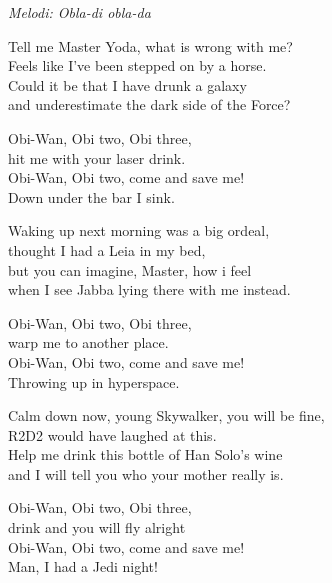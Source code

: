 {\footnotesize\textit{Melodi: Obla-di obla-da}}\par
\vspace{10pt}
Tell me Master Yoda, what is wrong with me?\\
Feels like I've been stepped on by a horse.\\
Could it be that I have drunk a galaxy\\
and underestimate the dark side of the Force?\par
\vspace{10pt}
Obi-Wan, Obi two, Obi three,\\
hit me with your laser drink.\\
Obi-Wan, Obi two, come and save me! \\
Down under the bar I sink.\par
\vspace{10pt}
Waking up next morning was a big ordeal,\\
thought I had a Leia in my bed,\\
but you can imagine, Master, how i feel\\
when I see Jabba lying there with me instead.\par
\vspace{10pt}
Obi-Wan, Obi two, Obi three,\\
warp me to another place.\\
Obi-Wan, Obi two, come and save me!\\
Throwing up in hyperspace.\par
\vspace{10pt}
Calm down now, young Skywalker, you will be fine,\\
R2D2 would have laughed at this.\\
Help me drink this bottle of Han Solo’s wine\\
and I will tell you who your mother really is.\par
\vspace{10pt}
Obi-Wan, Obi two, Obi three,\\
drink and you will fly alright\\
Obi-Wan, Obi two, come and save me!\\
Man, I had a Jedi night!

